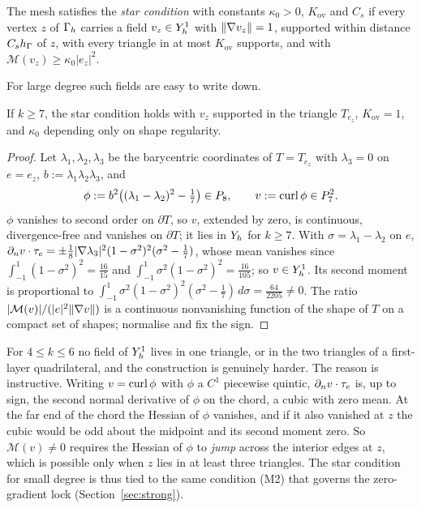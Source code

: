 \begin{definition}\label{def:star}
The mesh satisfies the \emph{star condition} with constants $\kappa_0>0$, $K_{\mathrm{ov}}$ and $C_s$ if every vertex $z$ of $\Gamma_h$ carries a field $v_z\in Y_h^1$ with $\lVert \nabla v_z\rVert=1$, supported within distance $C_sh_\Gamma$ of $z$, with every triangle in at most $K_{\mathrm{ov}}$ supports, and with $\mathcal M(v_z)\ge\kappa_0|e_z|^2$.
\end{definition}

For large degree such fields are easy to write down.

\begin{lemma}\label{lem:k7}
If $k\ge7$, the star condition holds with $v_z$ supported in the triangle $T_{e_z}$, $K_{\mathrm{ov}}=1$, and $\kappa_0$ depending only on shape regularity.
\end{lemma}

\begin{proof}
Let $\lambda_1,\lambda_2,\lambda_3$ be the barycentric coordinates of $T=T_{e_z}$ with $\lambda_3=0$ on $e=e_z$, $b:=\lambda_1\lambda_2\lambda_3$, and
\[
\phi:=b^2\bigl((\lambda_1-\lambda_2)^2-\tfrac17\bigr)\in P_8,\qquad v:=\operatorname{curl}\phi\in P_7^2 .
\]
$\phi$ vanishes to second order on $\partial T$, so $v$, extended by zero, is continuous, divergence-free and vanishes on $\partial T$; it lies in $Y_h$ for $k\ge7$. With $\sigma=\lambda_1-\lambda_2$ on $e$, $\partial_n v\cdot\tau_e=\pm\frac18|\nabla\lambda_3|^2(1-\sigma^2)^2(\sigma^2-\frac17)$, whose mean vanishes since $\int_{-1}^1(1-\sigma^2)^2=\frac{16}{15}$ and $\int_{-1}^1\sigma^2(1-\sigma^2)^2=\frac{16}{105}$; so $v\in Y_h^1$. Its second moment is proportional to $\int_{-1}^1\sigma^2(1-\sigma^2)^2(\sigma^2-\frac17)\,d\sigma=\frac{64}{2205}\ne0$. The ratio $|\mathcal M(v)|/(|e|^2\lVert \nabla v\rVert)$ is a continuous nonvanishing function of the shape of $T$ on a compact set of shapes; normalise and fix the sign.
\end{proof}

For $4\le k\le6$ no field of $Y_h^1$ lives in one triangle, or in the two triangles of a first-layer quadrilateral, and the construction is genuinely harder. The reason is instructive. Writing $v=\operatorname{curl}\phi$ with $\phi$ a $C^1$ piecewise quintic, $\partial_n v\cdot\tau_e$ is, up to sign, the second normal derivative of $\phi$ on the chord, a cubic with zero mean. At the far end of the chord the Hessian of $\phi$ vanishes, and if it also vanished at $z$ the cubic would be odd about the midpoint and its second moment zero. So $\mathcal M(v)\ne0$ requires the Hessian of $\phi$ to \emph{jump} across the interior edges at $z$, which is possible only when $z$ lies in at least three triangles. The star condition for small degree is thus tied to the same condition (M2) that governs the zero-gradient lock (Section~\ref{sec:strong}).

